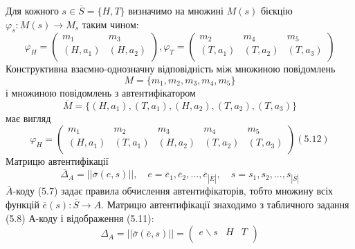 \begin{example}
    Для кожного $s \in \overline{S} = \{H, T\}$ визначимо на множині $M(s)$ бієкцію
    $\varphi_s: M(s) \rightarrow M_s$ таким чином:
    \begin{equation*}
        \varphi_H = \begin{pmatrix}
            m_1 & m_3 \\
            (H, a_1) & (H, a_2)\\
        \end{pmatrix},
        \varphi_T = \begin{pmatrix}
            m_2 & m_4 & m_5 \\
            (T, a_1) & (T, a_2) & (T, a_3)\\
        \end{pmatrix}
    \end{equation*}
    Конструктивна взаємно-однозначну відповідність між множиною
    повідомлень
    \begin{equation*}
        M = \{m_1, m_2, m_3, m_4, m_5\}
    \end{equation*}
    і множиною повідомлень з автентифікатором
    \begin{equation*}
        \overline{M} = \{(H, a_1), (T, a_1), (H, a_2), (T, a_2), (T, a_3)\}
    \end{equation*}
    має вигляд
    \begin{equation*}
        \varphi_H = \begin{pmatrix}
            m_1 & m_2 & m_3 & m_4 & m_5 \\
            (H, a_1) & (T, a_1) & (H, a_2) & (T, a_2) & (T, a_3)\\
        \end{pmatrix} (5.12)
    \end{equation*}
    Матрицю автентифікації
    \begin{equation*}
        \overline{\Delta}_A = ||\overline{\sigma}(e,s)||,
            \quad e = \overline{e}_1, \overline{e}_2, ..., \overline{e}_{|\overline{E}|},
            \quad s = s_1, s_2, ..., s_{|\overline{S}|} 
    \end{equation*}
    $\overline{A}$-коду (5.7) задає правила обчислення автентифікаторів, тобто множину всіх
    функцій $\overline{e}(s): \overline{S} \rightarrow A$. Матрицю автентифікації знаходимо з табличного задання
    (5.8) А-коду і відображення (5.11):
    \begin{equation*}
        \Delta_A = ||\overline{\sigma}(\overline{e}, s)||
        = \begin{pmatrix}
            e\backslash s & H & T \\

\end{pmatrix}
\end{equation*}
\end{example}
